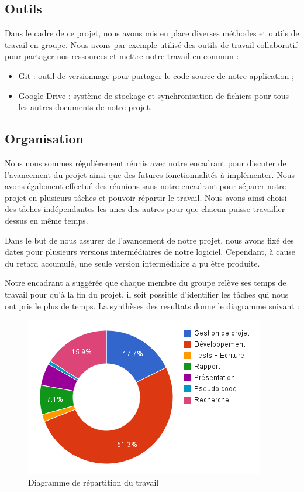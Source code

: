 \subsection{Outils}

Dans le cadre de ce projet, nous avons mis en place diverses méthodes et outils de travail en groupe. Nous avons par exemple utilisé des outils de travail collaboratif pour partager nos ressources et mettre notre travail en commun :
\begin{itemize}
        \item Git : outil de versionnage pour partager le code source de notre application ;
        \item Google Drive : système de stockage et synchronisation de fichiers pour tous les autres documents de notre projet.
\end{itemize}

\subsection{Organisation}

Nous nous sommes régulièrement réunis avec notre encadrant pour discuter de l’avancement du projet ainsi que des futures fonctionnalités à implémenter. Nous avons également effectué des réunions sans notre encadrant pour séparer notre projet en plusieurs tâches et pouvoir répartir le travail. Nous avons ainsi choisi des tâches indépendantes les unes des autres pour que chacun puisse travailler dessus en même temps.

Dans le but de nous assurer de l'avancement de notre projet, nous avons fixé des dates pour plusieurs versions intermédiaires de notre logiciel. Cependant, à cause du retard accumulé, une seule version intermédiaire a pu être produite.

Notre encadrant a suggérée que chaque membre du groupe relève ses temps de travail pour qu'à la fin du projet, il soit possible d'identifier les tâches qui nous ont pris le plus de temps. La synthèses des resultats donne le diagramme suivant :

\begin{figure}[!h]
  \begin{center}
  \includegraphics[scale=1]{res/05-1-work_repartition_chart.png}
  \caption{Diagramme de répartition du travail}
  \label{05-1-work_repartition_chart}
  \end{center}
\end{figure}

